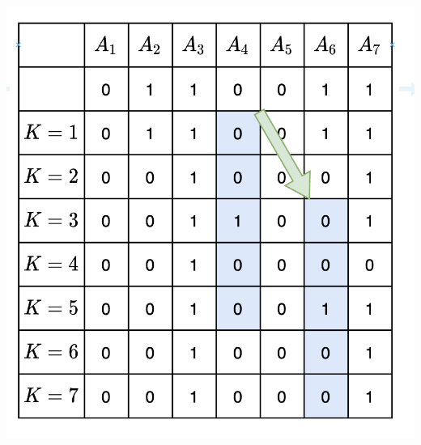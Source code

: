 \documentclass[a4paper,12pt]{article}
\begin{document}
\includegraphics[scale=0.8]{20211128215156.png}
\end{document}
